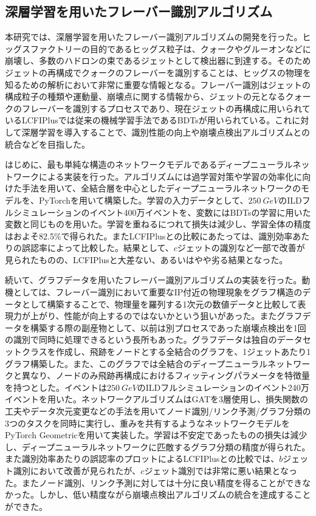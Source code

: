 \subsection*{深層学習を用いたフレーバー識別アルゴリズム}
本研究では、深層学習を用いたフレーバー識別アルゴリズムの開発を行った。ヒッグスファクトリーの目的であるヒッグス粒子は、クォークやグルーオンなどに崩壊し、多数のハドロンの束であるジェットとして検出器に到達する。そのためジェットの再構成でクォークのフレーバーを識別することは、ヒッグスの物理を知るための解析において非常に重要な情報となる。フレーバー識別はジェットの構成粒子の種類や運動量、崩壊点に関する情報から、ジェットの元となるクォークのフレーバーを識別するプロセスであり、現在ジェットの再構成に用いられているLCFIPlusでは従来の機械学習手法であるBDTsが用いられている。これに対して深層学習を導入することで、識別性能の向上や崩壊点検出アルゴリズムとの統合などを目指した。

はじめに、最も単純な構造のネットワークモデルであるディープニューラルネットワークによる実装を行った。アルゴリズムには過学習対策や学習の効率化に向けた手法を用いて、全結合層を中心としたディープニューラルネットワークのモデルを、PyTorchを用いて構築した。学習の入力データとして、$\SI{250}{GeV}$のILDフルシミュレーションのイベント400万イベントを、変数にはBDTsの学習に用いた変数と同じものを用いた。学習を重ねるにつれて損失は減少し、学習全体の精度はおよそ82.5\%で得られた。またLCFIPlusとの比較にあたっては、識別効率あたりの誤認率によって比較した。結果として、$c$ジェットの識別など一部で改善が見られたものの、LCFIPlusと大差ない、あるいはやや劣る結果となった。

続いて、グラフデータを用いたフレーバー識別アルゴリズムの実装を行った。動機としては、フレーバー識別において重要なIP付近の物理現象をグラフ構造のデータとして構築することで、物理量を羅列する1次元の数値データと比較して表現力が上がり、性能が向上するのではないかという狙いがあった。またグラフデータを構築する際の副産物として、以前は別プロセスであった崩壊点検出を1回の識別で同時に処理できるという長所もあった。グラフデータは独自のデータセットクラスを作成し、飛跡をノードとする全結合のグラフを、1ジェットあたり1グラフ構築した。また、このグラフでは全結合のディープニューラルネットワークと異なり、ノードのみ飛跡再構成におけるフィッティングパラメータを特徴量を持つとした。イベントは$\SI{250}{GeV}$のILDフルシミュレーションのイベント240万イベントを用いた。ネットワークアルゴリズムはGATを3層使用し、損失関数の工夫やデータ次元変更などの手法を用いてノード識別/リンク予測/グラフ分類の3つのタスクを同時に実行し、重みを共有するようなネットワークモデルをPyTorch Geometricを用いて実装した。学習は不安定であったものの損失は減少し、ディープニューラルネットワークに匹敵するグラフ分類の精度が得られた。また識別効率あたりの誤認率のプロットによるLCFIPlusとの比較では、$b$ジェット識別において改善が見られたが、$c$ジェット識別では非常に悪い結果となった。またノード識別、リンク予測に対しては十分に良い精度を得ることができなかった。しかし、低い精度ながら崩壊点検出アルゴリズムの統合を達成することができた。

